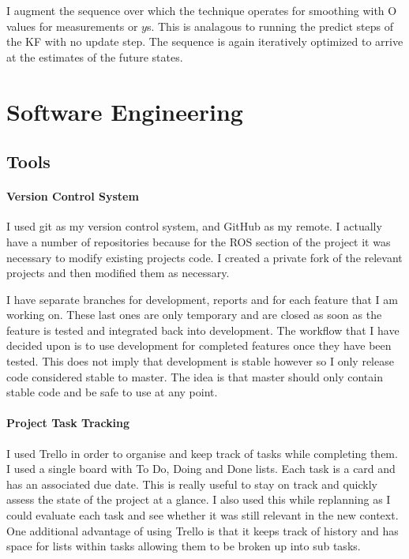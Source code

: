 \documentclass[]{../resources/final_report}
\begin{document}
I augment the sequence over which the technique operates for smoothing with O values for 
measurements or $y$s. This is analagous to running the predict steps of the KF with no update step.
The sequence is again iteratively optimized to arrive at the estimates of the future states.



\chapter{Software Engineering}

\section{Tools}

\subsubsection{Version Control System}

I used git as my version control system, and GitHub as my remote. I actually have a number of 
repositories because for the ROS section of the project it was necessary to modify existing 
projects code. I created a private fork of the relevant projects and then modified them as necessary.

I have separate branches for development, reports and for each feature that I am working on. 
These last ones are only temporary and are closed as soon as the feature is tested and integrated 
back into development. The workflow that I have decided upon is to use development for completed 
features once they have been tested. This does not imply that development is stable however so I 
only release code considered stable to master. The idea is that master should only contain stable 
code and be safe to use at any point.

\subsubsection{Project Task Tracking}

I used Trello in order to organise and keep track of tasks while completing them. I used a single 
board with To Do, Doing and Done lists. Each task is a card and has an associated due date.
This is really useful to stay on track and quickly assess the state of the project at a glance. 
I also used this while replanning as I could evaluate each task and see whether it was still 
relevant in the new context. One additional advantage of using Trello is that it keeps track of 
history and has space for lists within tasks allowing them to be broken up into sub tasks.
\end{document}
